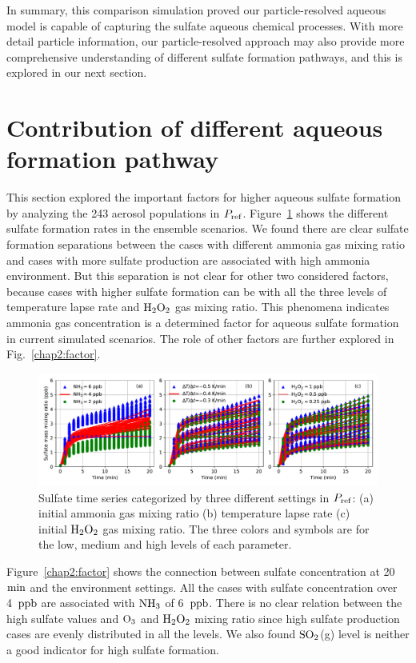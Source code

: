 \documentclass[edeposit,fullpage]{uiucthesis2009}
\makeatletter
\DeclareRobustCommand*\unit[1]
 {\ensuremath{%
   {\thinmuskip3mu\relax
    \def\mu{\text{\textmu}}\def~{\,}%
    \ifx\f@series\testbx\mathbf{#1}\else\mathrm{#1}\fi}}}
\makeatother
\begin{document}
In summary, this comparison simulation proved our particle-resolved aqueous model is capable of capturing the sulfate aqueous chemical processes. 
With more detail particle information, our particle-resolved approach may also provide more comprehensive understanding of different sulfate formation pathways, and this is explored in our next section. 
\section{Contribution of different aqueous formation pathway}

This section explored the important factors for higher aqueous sulfate formation by analyzing the 243 aerosol populations in $P_{\rm ref}$.
Figure~\ref{chap2:ens_three} shows the different sulfate formation rates in the ensemble scenarios. We found there are clear sulfate formation separations between the cases with different ammonia gas mixing ratio and cases with more sulfate production are associated with high ammonia environment. But this separation is not clear for other two considered factors, because cases with higher sulfate formation can be with all the three levels of temperature lapse rate and $\rm H_2O_2$ gas mixing ratio. This phenomena indicates ammonia gas concentration is a determined factor for aqueous sulfate formation in current simulated scenarios. The role of other factors are further explored in Fig.~\ref{chap2:factor}.

\begin{figure}[ht]
    \centering \includegraphics[scale=0.6]{chap2_figs/chap2_fig2_mono_ensemble.pdf}
    \caption{Sulfate time series categorized by three different settings in $P_{\rm ref}$: (a) initial ammonia gas mixing ratio (b) temperature lapse rate (c) initial $\rm H_2O_2$ gas mixing ratio. The three colors and symbols are for the low, medium and high levels of each parameter.}
    \label{chap2:ens_three}
\end{figure}

Figure~\ref{chap2:factor} shows the connection between sulfate concentration at 20~\unit{min} and the environment settings. All the cases with sulfate concentration over 4~\unit{ppb} are associated with $\rm NH_3$ of 6~\unit{ppb}. There is no clear relation between the high sulfate values and $\rm O_3$ and $\rm H_2O_2$ mixing ratio since high sulfate production cases are evenly distributed in all the levels. We also found $\rm SO_2$(g) level is neither a good indicator for high sulfate formation. 
\end{document}

